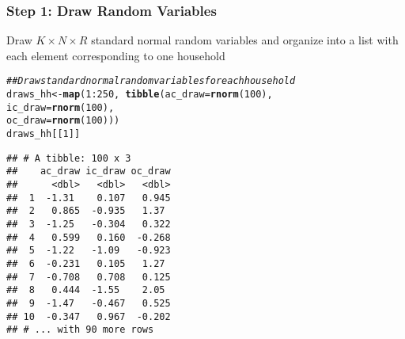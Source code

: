 \documentclass{beamer}\usepackage[]{graphicx}\usepackage[]{color}
\makeatletter
\newcommand{\hlnum}[1]{\textcolor[rgb]{0.686,0.059,0.569}{#1}}%
\newcommand{\hlcom}[1]{\textcolor[rgb]{0.678,0.584,0.686}{\textit{#1}}}%
\newcommand{\hlopt}[1]{\textcolor[rgb]{0,0,0}{#1}}%
\newcommand{\hlstd}[1]{\textcolor[rgb]{0.345,0.345,0.345}{#1}}%
\newcommand{\hlkwb}[1]{\textcolor[rgb]{0.69,0.353,0.396}{#1}}%
\newcommand{\hlkwc}[1]{\textcolor[rgb]{0.333,0.667,0.333}{#1}}%
\newcommand{\hlkwd}[1]{\textcolor[rgb]{0.737,0.353,0.396}{\textbf{#1}}}%
\newenvironment{kframe}{%
 \def\at@end@of@kframe{}%
 \ifinner\ifhmode%
  \def\at@end@of@kframe{\end{minipage}}%
  \begin{minipage}{\columnwidth}%
 \fi\fi%
 \def\FrameCommand##1{\hskip\@totalleftmargin \hskip-\fboxsep
 \colorbox{shadecolor}{##1}\hskip-\fboxsep
     \hskip-\linewidth \hskip-\@totalleftmargin \hskip\columnwidth}%
 \MakeFramed {\advance\hsize-\width
   \@totalleftmargin\z@ \linewidth\hsize
   \@setminipage}}%
 {\par\unskip\endMakeFramed%
 \at@end@of@kframe}
\newenvironment{knitrout}{}{} %
\makeatother
\begin{document}
\begin{frame}[fragile]\frametitle{Step 1: Draw Random Variables}
	Draw $K \times N \times R$ standard normal random variables and organize into a list with each element corresponding to one household \\
    \vspace{1ex}
\begin{knitrout}\scriptsize
{}\color{fgcolor}\begin{kframe}
\begin{alltt}
\hlcom{## Draw standard normal random variables for each household}
\hlstd{draws_hh} \hlkwb{<-} \hlkwd{map}\hlstd{(}\hlnum{1}\hlopt{:}\hlnum{250}\hlstd{,} \hlopt{~} \hlkwd{tibble}\hlstd{(}\hlkwc{ac_draw} \hlstd{=} \hlkwd{rnorm}\hlstd{(}\hlnum{100}\hlstd{),}
                                \hlkwc{ic_draw} \hlstd{=} \hlkwd{rnorm}\hlstd{(}\hlnum{100}\hlstd{),}
                                \hlkwc{oc_draw} \hlstd{=} \hlkwd{rnorm}\hlstd{(}\hlnum{100}\hlstd{)))}
\hlstd{draws_hh[[}\hlnum{1}\hlstd{]]}
\end{alltt}
\begin{verbatim}
## # A tibble: 100 x 3
##    ac_draw ic_draw oc_draw
##      <dbl>   <dbl>   <dbl>
##  1  -1.31    0.107   0.945
##  2   0.865  -0.935   1.37 
##  3  -1.25   -0.304   0.322
##  4   0.599   0.160  -0.268
##  5  -1.22   -1.09   -0.923
##  6  -0.231   0.105   1.27 
##  7  -0.708   0.708   0.125
##  8   0.444  -1.55    2.05 
##  9  -1.47   -0.467   0.525
## 10  -0.347   0.967  -0.202
## # ... with 90 more rows
\end{verbatim}
\end{kframe}
\end{knitrout}
\end{frame}
\end{document}
